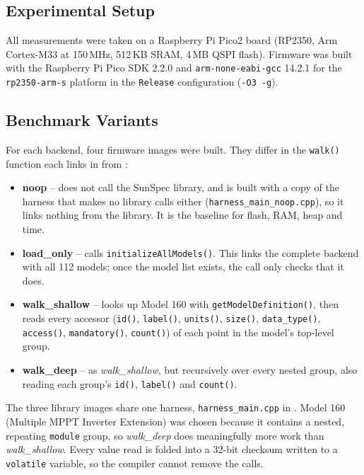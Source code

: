 \documentclass{article}
\begin{document}
\subsection{Experimental Setup}
All measurements were taken on a Raspberry Pi Pico2 board (RP2350, Arm Cortex-M33 at 150\,MHz, 512\,KB SRAM, 4\,MB QSPI flash). Firmware was built with the Raspberry Pi Pico SDK 2.2.0 and \texttt{arm-none-eabi-gcc} 14.2.1 for the \texttt{rp2350-arm-s} platform in the \texttt{Release} configuration (\texttt{-O3 -g}).

\subsection{Benchmark Variants}
For each backend, four firmware images were built. They differ in the \texttt{walk()} function each links in from :

\begin{itemize}
    \item \textbf{noop} -- does not call the SunSpec library, and is built with a copy of the harness that makes no library calls either (\texttt{harness\_main\_noop.cpp}), so it links nothing from the library. It is the baseline for flash, RAM, heap and time.
    \item \textbf{load\_only} -- calls \texttt{initializeAllModels()}. This links the complete backend with all 112 models; once the model list exists, the call only checks that it does.
    \item \textbf{walk\_shallow} -- looks up Model 160 with \texttt{getModelDefinition()}, then reads every accessor (\texttt{id()}, \texttt{label()}, \texttt{units()}, \texttt{size()}, \texttt{data\_type()}, \texttt{access()}, \texttt{mandatory()}, \texttt{count()}) of each point in the model's top-level group.
    \item \textbf{walk\_deep} -- as \textit{walk\_shallow}, but recursively over every nested group, also reading each group's \texttt{id()}, \texttt{label()} and \texttt{count()}.
\end{itemize}

The three library images share one harness, \texttt{harness\_main.cpp} in . Model 160 (Multiple MPPT Inverter Extension) was chosen because it contains a nested, repeating \texttt{module} group, so \textit{walk\_deep} does meaningfully more work than \textit{walk\_shallow}. Every value read is folded into a 32-bit checksum written to a \texttt{volatile} variable, so the compiler cannot remove the calls.
\end{document}
